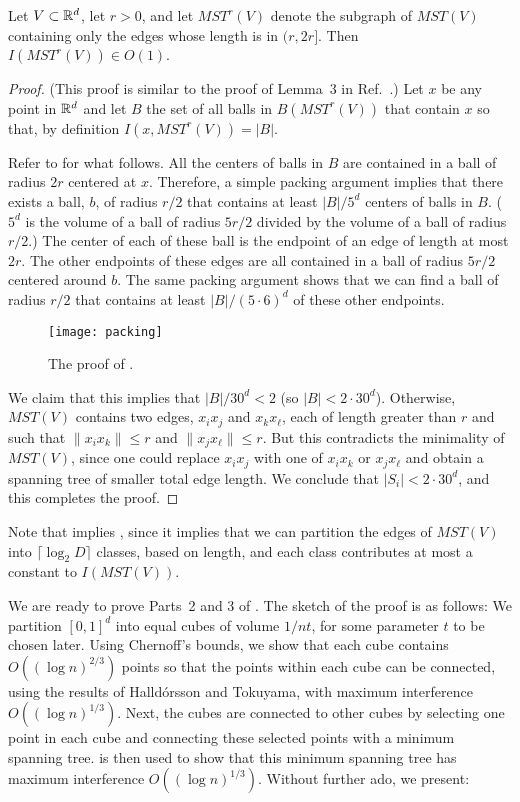 \documentclass{patmorin}
\newcommand{\mst}{\mathit{MST}}
\begin{document}
\begin{lem}
  Let $V\subset\mathbb{R}^d$, let $r>0$, and let $\mst^r(V)$ denote the subgraph
  of $\mst(V)$ containing only the edges whose length is in $(r,2r]$.
  Then $I(\mst^r(V))\in O(1)$.
\end{lem}

\begin{proof}
(This proof is similar to the proof of Lemma~3 in Ref.~\cite{msz11}.)
Let $x$ be any point in $\mathbb{R}^d$ and let $B$ the set of all
balls in $B(\mst^r(V))$ that contain $x$ so that, by definition
$I(x,\mst^r(V))=|B|$.  

Refer to  for what follows.  All the centers of balls in
$B$ are contained in a ball of radius $2r$ centered at $x$.  Therefore,
a simple packing argument implies that there exists a ball, $b$, of
radius $r/2$ that contains at least $|B|/5^d$ centers of balls in $B$.
($5^d$ is the volume of a ball of radius $5r/2$ divided by the volume
of a ball of radius $r/2$.)  The center of each of these ball is the
endpoint of an edge of length at most $2r$.  The other endpoints of these
edges are all contained in a ball of radius $5r/2$ centered around $b$.
The same packing argument shows that we can find a ball of radius $r/2$
that contains at least $|B|/(5\cdot 6)^d$ of these other endpoints.

\begin{figure}
  \begin{center}
    \texttt{[image: packing]}
  \end{center}
  \caption{The proof of .}
\end{figure}

We claim that this implies that $|B|/30^d< 2$ (so $|B|< 2\cdot
30^d$). Otherwise, $\mst(V)$ contains two edges, $x_ix_j$ and $x_kx_\ell$,
each of length greater than $r$ and such that $\|x_ix_k\| \le r$ and
$\|x_jx_\ell\|\le r$.  But this contradicts the minimality of $\mst(V)$,
since one could replace $x_ix_j$ with one of $x_ix_k$ or $x_jx_\ell$
and obtain a spanning tree of smaller total edge length.  We conclude
that $|S_i|< 2\cdot 30^d$, and this completes the proof.
\end{proof}

Note that  implies , since it implies that we
can partition the edges of $\mst(V)$ into $\lceil\log_2 D\rceil$ classes,
based on length, and each class contributes at most a constant to $I(\mst(V))$.

We are ready to prove Parts~2 and 3 of .  The sketch of the
proof is as follows:  We partition $[0,1]^d$ into equal cubes of volume
$1/nt$, for some parameter $t$ to be chosen later.  Using Chernoff's
bounds, we show that each cube contains $O((\log n)^{2/3})$ points so
that the points within each cube can be connected, using the results of
Halld\'orsson and Tokuyama, with maximum interference $O((\log n)^{1/3})$.
Next, the cubes are connected to other cubes by selecting one point in
each cube and connecting these selected points with a minimum spanning
tree.   is then used to show that this minimum spanning
tree has maximum interference $O((\log n)^{1/3})$.  Without further ado,
we present:
\end{document}
